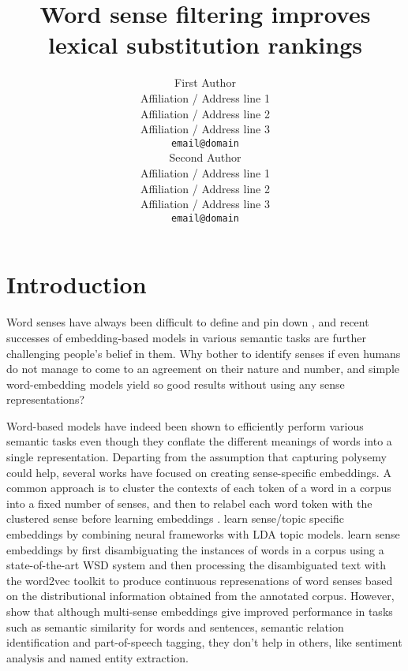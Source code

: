 \documentclass[11pt]{article}
\title{Word sense filtering improves lexical substitution rankings}
\author{First Author \\
  Affiliation / Address line 1 \\
  Affiliation / Address line 2 \\
  Affiliation / Address line 3 \\
  {\tt email@domain} \\\And
  Second Author \\
  Affiliation / Address line 1 \\
  Affiliation / Address line 2 \\
  Affiliation / Address line 3 \\
  {\tt email@domain} \\}
\date{}
\begin{document}
\maketitle
\begin{abstract}


\end{abstract}

\section{Introduction}

Word senses have always been difficult to define and pin down \cite{kilgarriff1997don,erk2009investigations}, and recent successes of embedding-based models in various semantic tasks are further challenging people's belief in them. Why bother to identify senses if even humans do not manage to come to an agreement on their nature and number, and simple word-embedding models yield so good results without using any sense representations? 

Word-based models have indeed been shown to efficiently perform various semantic tasks even though they conflate the different meanings of words into a single representation. Departing from the assumption that capturing polysemy %
could help, several works have focused on creating sense-specific embeddings. A common approach %
is to cluster the contexts of each token of a word in a corpus into a fixed number of senses, and then to relabel each word token with the clustered sense before learning embeddings \cite{reisinger-mooney:2010:NAACLHLT,huang-EtAl:2012:ACL20122}.  learn sense/topic specific embeddings by combining neural frameworks with LDA topic models.  learn sense embeddings by first disambiguating the instances of words in a corpus using a state-of-the-art WSD system and then processing the disambiguated text with the word2vec toolkit \cite{Mikolovetal2013} to produce continuous represenations of word senses based on the distributional information obtained from the annotated corpus. %
However,  show that although multi-sense embeddings give improved performance in tasks such as semantic similarity for words and sentences, semantic relation identification and part-of-speech tagging, they don't help in others, like sentiment analysis and named entity extraction. 
\end{document}
